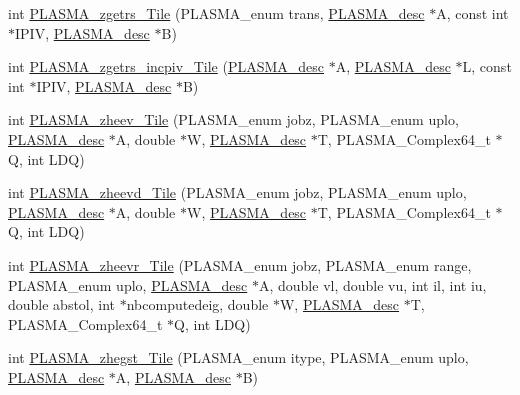 \begin{DoxyCompactItemize}
\item 
int \hyperlink{group__PLASMA__Complex64__t__Tile_ga143e5ed5a42b9fa3ae76b4df3258d071_ga143e5ed5a42b9fa3ae76b4df3258d071}{P\+L\+A\+S\+M\+A\+\_\+zgetrs\+\_\+\+Tile} (P\+L\+A\+S\+M\+A\+\_\+enum trans, \hyperlink{structplasma__desc__t}{P\+L\+A\+S\+M\+A\+\_\+desc} $\ast$A, const int $\ast$I\+P\+I\+V, \hyperlink{structplasma__desc__t}{P\+L\+A\+S\+M\+A\+\_\+desc} $\ast$B)
\item 
int \hyperlink{group__PLASMA__Complex64__t__Tile_gab5c4dcbb8ce3878a5ed028a7485c6484_gab5c4dcbb8ce3878a5ed028a7485c6484}{P\+L\+A\+S\+M\+A\+\_\+zgetrs\+\_\+incpiv\+\_\+\+Tile} (\hyperlink{structplasma__desc__t}{P\+L\+A\+S\+M\+A\+\_\+desc} $\ast$A, \hyperlink{structplasma__desc__t}{P\+L\+A\+S\+M\+A\+\_\+desc} $\ast$L, const int $\ast$I\+P\+I\+V, \hyperlink{structplasma__desc__t}{P\+L\+A\+S\+M\+A\+\_\+desc} $\ast$B)
\item 
int \hyperlink{group__PLASMA__Complex64__t__Tile_ga8950fc5b8aad1db5b23a369c7971f935_ga8950fc5b8aad1db5b23a369c7971f935}{P\+L\+A\+S\+M\+A\+\_\+zheev\+\_\+\+Tile} (P\+L\+A\+S\+M\+A\+\_\+enum jobz, P\+L\+A\+S\+M\+A\+\_\+enum uplo, \hyperlink{structplasma__desc__t}{P\+L\+A\+S\+M\+A\+\_\+desc} $\ast$A, double $\ast$W, \hyperlink{structplasma__desc__t}{P\+L\+A\+S\+M\+A\+\_\+desc} $\ast$T, P\+L\+A\+S\+M\+A\+\_\+\+Complex64\+\_\+t $\ast$Q, int L\+D\+Q)
\item 
int \hyperlink{group__PLASMA__Complex64__t__Tile_gacf562f4797071417427688a0bcb590e9_gacf562f4797071417427688a0bcb590e9}{P\+L\+A\+S\+M\+A\+\_\+zheevd\+\_\+\+Tile} (P\+L\+A\+S\+M\+A\+\_\+enum jobz, P\+L\+A\+S\+M\+A\+\_\+enum uplo, \hyperlink{structplasma__desc__t}{P\+L\+A\+S\+M\+A\+\_\+desc} $\ast$A, double $\ast$W, \hyperlink{structplasma__desc__t}{P\+L\+A\+S\+M\+A\+\_\+desc} $\ast$T, P\+L\+A\+S\+M\+A\+\_\+\+Complex64\+\_\+t $\ast$Q, int L\+D\+Q)
\item 
int \hyperlink{group__PLASMA__Complex64__t__Tile_ga209c71167d600073b6b3ffab59345a1f_ga209c71167d600073b6b3ffab59345a1f}{P\+L\+A\+S\+M\+A\+\_\+zheevr\+\_\+\+Tile} (P\+L\+A\+S\+M\+A\+\_\+enum jobz, P\+L\+A\+S\+M\+A\+\_\+enum range, P\+L\+A\+S\+M\+A\+\_\+enum uplo, \hyperlink{structplasma__desc__t}{P\+L\+A\+S\+M\+A\+\_\+desc} $\ast$A, double vl, double vu, int il, int iu, double abstol, int $\ast$nbcomputedeig, double $\ast$W, \hyperlink{structplasma__desc__t}{P\+L\+A\+S\+M\+A\+\_\+desc} $\ast$T, P\+L\+A\+S\+M\+A\+\_\+\+Complex64\+\_\+t $\ast$Q, int L\+D\+Q)
\item 
int \hyperlink{group__PLASMA__Complex64__t__Tile_gaa28f6da2b7b8e8af7abf429f7f01047d_gaa28f6da2b7b8e8af7abf429f7f01047d}{P\+L\+A\+S\+M\+A\+\_\+zhegst\+\_\+\+Tile} (P\+L\+A\+S\+M\+A\+\_\+enum itype, P\+L\+A\+S\+M\+A\+\_\+enum uplo, \hyperlink{structplasma__desc__t}{P\+L\+A\+S\+M\+A\+\_\+desc} $\ast$A, \hyperlink{structplasma__desc__t}{P\+L\+A\+S\+M\+A\+\_\+desc} $\ast$B)

\end{DoxyCompactItemize}
